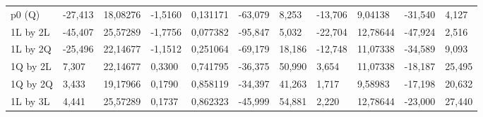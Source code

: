 \begin{table}[H]
{\begin{tabular}{lllllllllll}
\rowcolor[HTML]{FFFFFF} 
{\color[HTML]{000000} p0      (Q)}    & {\color[HTML]{000000} -27,413}  & {\color[HTML]{000000} 18,08276} & {\color[HTML]{000000} -1,5160}  & {\color[HTML]{000000} 0,131171} & {\color[HTML]{000000} -63,079}        & {\color[HTML]{000000} 8,253}          & {\color[HTML]{000000} -13,706}  & {\color[HTML]{000000} 9,04138}       & {\color[HTML]{000000} -31,540}        & {\color[HTML]{000000} 4,127}          \\
\rowcolor[HTML]{FFFFFF} 
{\color[HTML]{000000} 1L by 2L}       & {\color[HTML]{000000} -45,407}  & {\color[HTML]{000000} 25,57289} & {\color[HTML]{000000} -1,7756}  & {\color[HTML]{000000} 0,077382} & {\color[HTML]{000000} -95,847}        & {\color[HTML]{000000} 5,032}          & {\color[HTML]{000000} -22,704}  & {\color[HTML]{000000} 12,78644}      & {\color[HTML]{000000} -47,924}        & {\color[HTML]{000000} 2,516}          \\
\rowcolor[HTML]{FFFFFF} 
{\color[HTML]{000000} 1L by 2Q}       & {\color[HTML]{000000} -25,496}  & {\color[HTML]{000000} 22,14677} & {\color[HTML]{000000} -1,1512}  & {\color[HTML]{000000} 0,251064} & {\color[HTML]{000000} -69,179}        & {\color[HTML]{000000} 18,186}         & {\color[HTML]{000000} -12,748}  & {\color[HTML]{000000} 11,07338}      & {\color[HTML]{000000} -34,589}        & {\color[HTML]{000000} 9,093}          \\
\rowcolor[HTML]{FFFFFF} 
{\color[HTML]{000000} 1Q by 2L}       & {\color[HTML]{000000} 7,307}    & {\color[HTML]{000000} 22,14677} & {\color[HTML]{000000} 0,3300}   & {\color[HTML]{000000} 0,741795} & {\color[HTML]{000000} -36,375}        & {\color[HTML]{000000} 50,990}         & {\color[HTML]{000000} 3,654}    & {\color[HTML]{000000} 11,07338}      & {\color[HTML]{000000} -18,187}        & {\color[HTML]{000000} 25,495}         \\
\rowcolor[HTML]{FFFFFF} 
{\color[HTML]{000000} 1Q by 2Q}       & {\color[HTML]{000000} 3,433}    & {\color[HTML]{000000} 19,17966} & {\color[HTML]{000000} 0,1790}   & {\color[HTML]{000000} 0,858119} & {\color[HTML]{000000} -34,397}        & {\color[HTML]{000000} 41,263}         & {\color[HTML]{000000} 1,717}    & {\color[HTML]{000000} 9,58983}       & {\color[HTML]{000000} -17,198}        & {\color[HTML]{000000} 20,632}         \\
\rowcolor[HTML]{FFFFFF} 
{\color[HTML]{000000} 1L by 3L}       & {\color[HTML]{000000} 4,441}    & {\color[HTML]{000000} 25,57289} & {\color[HTML]{000000} 0,1737}   & {\color[HTML]{000000} 0,862323} & {\color[HTML]{000000} -45,999}        & {\color[HTML]{000000} 54,881}         & {\color[HTML]{000000} 2,220}    & {\color[HTML]{000000} 12,78644}      & {\color[HTML]{000000} -23,000}        & {\color[HTML]{000000} 27,440}         \\

\end{tabular}}
\end{table}
